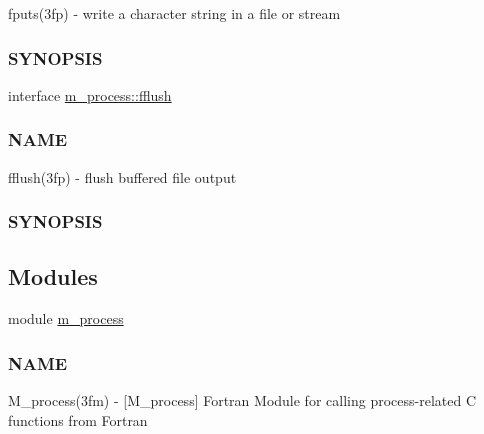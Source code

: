 \begin{DoxyCompactItemize}
\begin{DoxyCompactList}
fputs(3fp) -\/ write a character string in a file or stream \subsubsection*{S\+Y\+N\+O\+P\+S\+IS}\end{DoxyCompactList}\item 
interface \hyperlink{interfacem__process_1_1fflush}{m\+\_\+process\+::fflush}
\begin{DoxyCompactList}\small\item\em \subsubsection*{N\+A\+ME}

fflush(3fp) -\/ flush buffered file output \subsubsection*{S\+Y\+N\+O\+P\+S\+IS}\end{DoxyCompactList}\end{DoxyCompactItemize}
\subsection*{Modules}
\begin{DoxyCompactItemize}
\item 
module \hyperlink{namespacem__process}{m\+\_\+process}
\begin{DoxyCompactList}\small\item\em \subsubsection*{N\+A\+ME}

M\+\_\+process(3fm) -\/ \mbox{[}M\+\_\+process\mbox{]} Fortran Module for calling process-\/related C functions from Fortran \end{DoxyCompactList}\end{DoxyCompactItemize}
